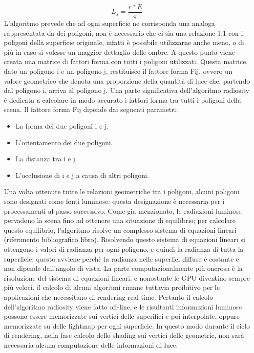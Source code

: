 \begin{equation}
L_s = \frac{r*E}{\pi}
\end{equation}
L’algoritmo prevede che ad ogni superficie ne corrisponda una analoga rappresentata da dei poligoni; non è necessario che ci sia una relazione 1:1 con i poligoni della superficie originale, infatti è possibile utilizzarne anche meno, o di più in caso si volesse un maggior dettaglio delle ombre. 
A questo punto viene creata una matrice di fattori forma con tutti i poligoni utilizzati. Questa matrice, dato un poligono i e un poligono j, restituisce il fattore forma Fij, ovvero un valore geometrico che denota una proporzione della quantità di luce che, partendo dal poligono i, arriva al poligono j. 
Una parte significativa dell’algoritmo radiosity è dedicata a calcolare in modo accurato i fattori forma tra tutti i poligoni della scena. 
Il fattore forma Fij dipende dai seguenti parametri:
\begin{itemize}
\item La forma dei due poligoni i e j.
\item L’orientamento dei due poligoni.
\item La distanza tra i e j.
\item L’occlusione di i e j a causa di altri poligoni.
\end{itemize}
Una volta ottenute tutte le relazioni geometriche tra i poligoni, alcuni poligoni sono designati come fonti luminose; questa designazione è necessaria per i processamenti al passo successivo. 
Come gia menzionato, le radiazioni luminose pervadono la scena fino ad ottenere una situazione di equilibrio; per calcolare questo equilibrio, l’algoritmo risolve un complesso sistema di equazioni lineari (riferimento bibliografico libro).
Risolvendo questo sistema di equazioni lineari si ottengono i valori di radianza per ogni poligono, e quindi la radianza di tutta la superficie; questo avviene perchè la radianza nelle superfici diffuse è costante e non dipende dall’angolo di vista.
La parte computazionalmente più onerosa è la risoluzione del sistema di equazioni lineari, e nonostante le GPU diventino sempre più veloci, il calcolo di alcuni algoritmi rimane tuttavia proibitivo per le applicazioni che necessitano di rendering real-time. 
Pertanto il calcolo dell’algoritmo radiosity viene fatto off-line, e le risultanti informazioni luminose possono essere memorizzate sui vertici delle superifici e poi interpolate, oppure memorizzate su delle lightmap per ogni superficie. 
In questo modo durante il ciclo di rendering, nella fase calcolo dello shading sui vertici delle geometrie, non sarà necessaria alcuna computazione delle informazioni di luce. 
